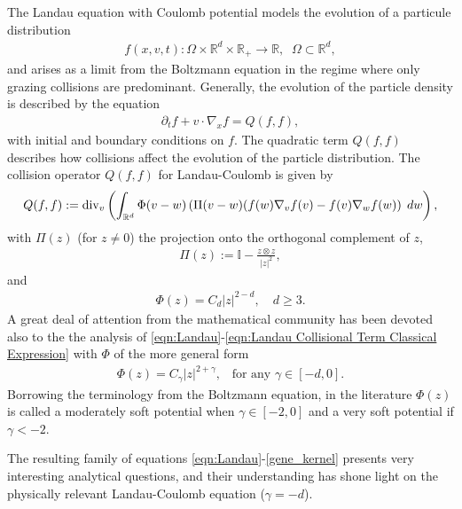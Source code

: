 \documentclass[12pt,american]{amsart}
\numberwithin{equation}{section}
\theoremstyle{plain}
\theoremstyle{definition}                  %
\def\dive{\textnormal{div}}
\def\Id{\mathbb{I}}
\begin{document}
The Landau equation with Coulomb potential models the evolution of a particule distribution
\begin{align*}
 f(x,v,t): \Omega \times \mathbb{R}^d\times\mathbb{R}_+\to\mathbb{R},\;\; \Omega\subset\mathbb{R}^d,
\end{align*} 
and arises as a limit from the Boltzmann equation in the regime where only grazing collisions are predominant. Generally, the evolution of the particle density is described by the equation
\begin{align}\label{eqn:Landau}
  \partial_tf +v\cdot\nabla_x f =Q(f,f),
\end{align}
with initial and boundary conditions on $f$. The quadratic term $Q(f,f)$ describes how collisions affect the evolution of the particle distribution. The collision operator $Q(f,f)$ for Landau-Coulomb is given by
\begin{align}\label{eqn:Landau Collisional Term Classical Expression}
  Q(f,f) := \dive_v \left (\int_{\mathbb{R}^d} \Phi(v-w)\left (\Pi(v-w)(f(w)\nabla_vf(v)-f(v)\nabla_wf(w) \right )\;dw \right ),
  \end{align}
  with $\Pi(z)$ (for $z\neq 0$) the projection onto the orthogonal complement of $z$,
  \begin{align*}
  \Pi(z) := \Id- \frac{ z\otimes z}{|z|^{2}},
  \end{align*}
  and 
  \begin{align*}
    \Phi(z) = C_d|z|^{2-d}, \quad d\geq 3.
  \end{align*}
  A great deal of attention from the mathematical community has been devoted also to the the analysis of \eqref{eqn:Landau}-\eqref{eqn:Landau Collisional Term Classical Expression} with $\Phi$ of the more general form
  \begin{align}
    \Phi(z) = C_\gamma |z|^{2+\gamma},\;\;\;\textrm{for any $\gamma\in[-d,0]$}.	\label{gene_kernel}
  \end{align}	
  Borrowing the terminology from the Boltzmann equation, in the literature $ \Phi(z)$ is called a moderately soft potential when $\gamma \in [-2,0]$  and  a very soft potential if $\gamma < -2$.
     
  The resulting family of equations \eqref{eqn:Landau}-\eqref{gene_kernel} presents very interesting analytical questions, and their understanding has shone light on the physically relevant Landau-Coulomb equation ($\gamma=-d$).
  
\end{document}
